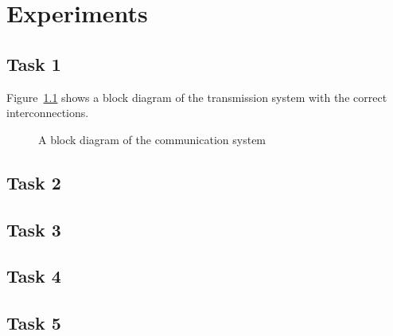 \documentclass[11pt,titlepage]{report}
\begin{document}
\chapter{Experiments}
\section{Task 1}
Figure~\ref{fig:block-diagram} shows a block diagram of the transmission system with the correct interconnections.

\begin{figure}[H]
	\centering
	
	\caption{A block diagram of the communication system}
	\label{fig:block-diagram}
\end{figure}

\section{Task 2}

\section{Task 3}

\section{Task 4}

\section{Task 5}
\end{document}
